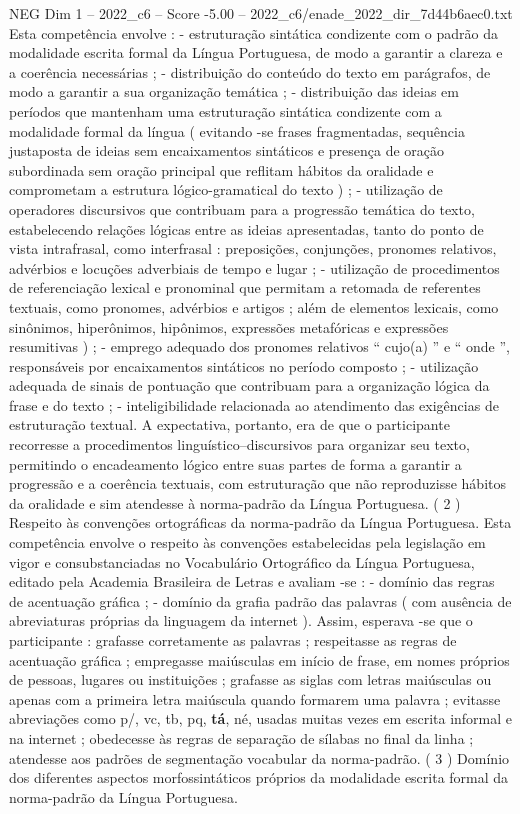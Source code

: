 \begin{textsample}{NEG Dim 1 – 2022\_c6 – Score -5.00 – 2022\_c6/enade\_2022\_dir\_7d44b6aec0.txt}
Esta competência envolve : - estruturação sintática condizente com o padrão da modalidade escrita formal da Língua Portuguesa, de modo a garantir a clareza e a coerência necessárias ; - distribuição do conteúdo do texto em parágrafos, de modo a garantir a sua organização temática ; - distribuição das ideias em períodos que mantenham uma estruturação sintática condizente com a modalidade formal da língua ( evitando -se frases fragmentadas, sequência justaposta de ideias sem encaixamentos sintáticos e presença de oração subordinada sem oração principal que reflitam hábitos da oralidade e comprometam a estrutura lógico-gramatical do texto ) ; - utilização de operadores discursivos que contribuam para a progressão temática do texto, estabelecendo relações lógicas entre as ideias apresentadas, tanto do ponto de vista intrafrasal, como interfrasal : preposições, conjunções, pronomes relativos, advérbios e locuções adverbiais de tempo e lugar ; - utilização de procedimentos de referenciação lexical e pronominal que permitam a retomada de referentes textuais, como pronomes, advérbios e artigos ; além de elementos lexicais, como sinônimos, hiperônimos, hipônimos, expressões metafóricas e expressões resumitivas ) ; - emprego adequado dos pronomes relativos “ cujo(a) ” e “ onde ”, responsáveis por encaixamentos sintáticos no período composto ; - utilização adequada de sinais de pontuação que contribuam para a organização lógica da frase e do texto ; - inteligibilidade relacionada ao atendimento das exigências de estruturação textual.
A expectativa, portanto, era de que o participante recorresse a procedimentos linguístico–discursivos para organizar seu texto, permitindo o encadeamento lógico entre suas partes de forma a garantir a progressão e a coerência textuais, com estruturação que não reproduzisse hábitos da oralidade e sim atendesse à norma-padrão da Língua Portuguesa. ( 2 ) Respeito às convenções ortográficas da norma-padrão da Língua Portuguesa.
Esta competência envolve o respeito às convenções estabelecidas pela legislação em vigor e consubstanciadas no Vocabulário Ortográfico da Língua Portuguesa, editado pela Academia Brasileira de Letras e avaliam -se : - domínio das regras de acentuação gráfica ; - domínio da grafia padrão das palavras ( com ausência de abreviaturas próprias da linguagem da internet ).
Assim, esperava -se que o participante : grafasse corretamente as palavras ; respeitasse as regras de acentuação gráfica ; empregasse maiúsculas em início de frase, em nomes próprios de pessoas, lugares ou instituições ; grafasse as siglas com letras maiúsculas ou apenas com a primeira letra maiúscula quando formarem uma palavra ; evitasse abreviações como p/, vc, tb, pq, \textbf{tá}, né, usadas muitas vezes em escrita informal e na internet ; obedecesse às regras de separação de sílabas no final da linha ; atendesse aos padrões de segmentação vocabular da norma-padrão. ( 3 ) Domínio dos diferentes aspectos morfossintáticos próprios da modalidade escrita formal da norma-padrão da Língua Portuguesa.

\end{textsample}
